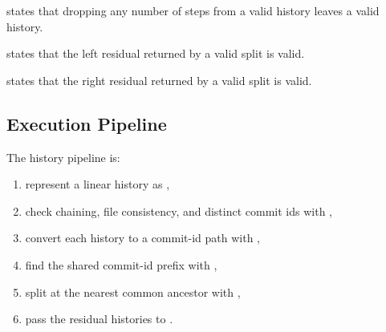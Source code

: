 \begin{theorem}
 states that dropping any number of steps from a valid
history leaves a valid history.
\end{theorem}

\begin{theorem}
 states that the left residual returned by a
valid split is valid.
\end{theorem}

\begin{theorem}
 states that the right residual returned by a
valid split is valid.
\end{theorem}

\subsection{Execution Pipeline}

The history pipeline is:

\begin{enumerate}
  \item represent a linear history as ,
  \item check chaining, file consistency, and distinct commit ids with
    ,
  \item convert each history to a commit-id path with ,
  \item find the shared commit-id prefix with ,
  \item split at the nearest common ancestor with
    ,
  \item pass the residual histories to .
\end{enumerate}
